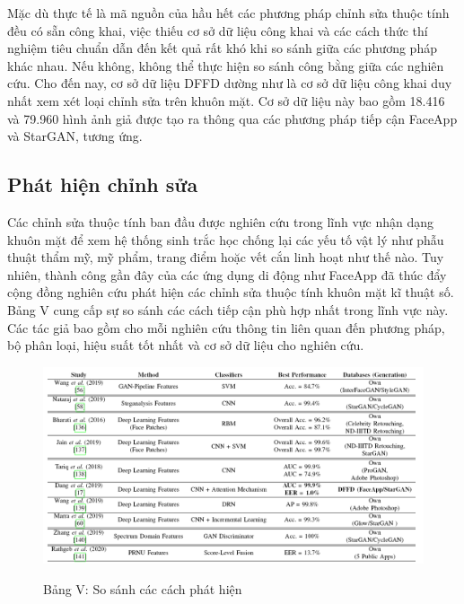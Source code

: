 \documentclass{article}
\begin{document}
Mặc dù thực tế là mã nguồn của hầu hết các phương pháp chỉnh sửa thuộc tính đều có sẵn công khai, việc thiếu cơ sở dữ liệu công khai và các cách thức thí nghiệm tiêu chuẩn dẫn đến kết quả rất khó khi so sánh giữa các phương pháp khác nhau. Nếu không, không thể thực hiện so sánh công bằng giữa các nghiên cứu. Cho đến nay, cơ sở dữ liệu DFFD  dường như là cơ sở dữ liệu công khai duy nhất xem xét loại chỉnh sửa trên khuôn mặt. Cơ sở dữ liệu này bao gồm 18.416 và 79.960 hình ảnh giả được tạo ra thông qua các phương pháp tiếp cận FaceApp và StarGAN, tương ứng.

\subsection{Phát hiện chỉnh sửa} \label{sec:5-b-detector}

Các chỉnh sửa thuộc tính ban đầu được nghiên cứu trong lĩnh vực nhận dạng khuôn mặt để xem hệ thống sinh trắc học chống lại các yếu tố vật lý như phẫu thuật thẩm mỹ, mỹ phẩm, trang điểm hoặc vết cắn linh hoạt như thế nào. Tuy nhiên, thành công gần đây của các ứng dụng di động như FaceApp đã thúc đẩy cộng đồng nghiên cứu phát hiện các chỉnh sửa thuộc tính khuôn mặt kĩ thuật số. Bảng V cung cấp sự so sánh các cách tiếp cận phù hợp nhất trong lĩnh vực này. Các tác giả bao gồm cho mỗi nghiên cứu thông tin liên quan đến phương pháp, bộ phân loại, hiệu suất tốt nhất và cơ sở dữ liệu cho nghiên cứu.


\begin{figure}[h!]
\caption{Bảng V: So sánh các cách phát hiện}
\includegraphics[width=\textwidth]{table-5-compare}
\label{table-5-compare}
\end{figure}
\end{document}
